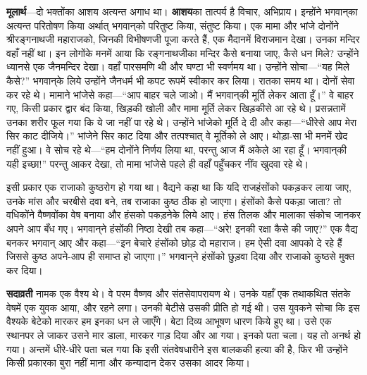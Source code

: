 \begin{sloppypar}\justifying{}
\textbf{मूलार्थ}—दो भक्तोंका आशय अत्यन्त अगाध था। \textbf{आशय}का तात्पर्य है विचार, अभिप्राय। इन्होंने भगवान्‌का अत्यन्त परितोषण किया अर्थात् भगवान्‌को परितुष्ट किया, संतुष्ट किया। एक मामा और भांजे दोनोंने श्रीरङ्गनाथजी महाराजको, जिनकी विभीषणजी पूजा करते हैं, एक मैदानमें विराजमान देखा। उनका मन्दिर वहाँ नहीं था। इन लोगोंके मनमें आया कि रङ्गनाथजीका मन्दिर कैसे बनाया जाए, कैसे धन मिले? उन्होंने ध्यानसे एक जैन\-मन्दिर देखा। वहाँ पारसमणि थी और घण्टा भी स्वर्णमय था। उन्होंने सोचा—“यह मिले कैसे?” भगवान्‌के लिये उन्होंने जैनधर्म भी कपट रूपमें स्वीकार कर लिया। रातका समय था। दोनों सेवा कर रहे थे। मामाने भांजेसे कहा—“आप बाहर चले जाओ। मैं भगवान्‌की मूर्ति लेकर आता हूँ।” वे बाहर गए, किसी प्रकार द्वार बंद किया, खिड़की खोली और मामा मूर्ति लेकर खिड़कीसे आ रहे थे। प्रसन्नतामें उनका शरीर फूल गया कि ये जा नहीं पा रहे थे। उन्होंने भांजेको मूर्ति दे दी और कहा—“धीरेसे आप मेरा सिर काट दीजिये।” भांजेने सिर काट दिया और तत्पश्चात् वे मूर्तिको ले आए। थोड़ा-सा भी मनमें खेद नहीं हुआ। वे सोच रहे थे—“हम दोनोंने निर्णय लिया था, परन्तु आज मैं अकेले आ रहा हूँ। भगवान्‌की यही इच्छा!” परन्तु आकर देखा, तो मामा भांजेसे पहले ही वहाँ पहुँचकर नींव खुदवा रहे थे।
\end{sloppypar}
\begin{sloppypar}\justifying{}
इसी प्रकार एक राजाको कुष्ठरोग हो गया था। वैद्यने कहा था कि यदि राजहंसोंको पकड़कर लाया जाए, उनके मांस और चरबीसे दवा बने, तब राजाका कुष्ठ ठीक हो जाएगा। हंसोंको कैसे पकड़ा जाता? तो वधिकोंने वैष्णवोंका वेष बनाया और हंसको पकड़नेके लिये आए। हंस तिलक और मालाका संकोच जानकर अपने आप बँध गए। भगवान्‌ने हंसोंकी निष्ठा देखी तब कहा—“अरे! इनकी रक्षा कैसे की जाए?” एक वैद्य बनकर भगवान् आए और कहा—“इन बेचारे हंसोंको छोड़ दो महाराज। हम ऐसी दवा आपको दे रहे हैं जिससे कुष्ठ अपने-आप ही समाप्त हो जाएगा।” भगवान्‌ने हंसोंको छुड़वा दिया और राजाको कुष्ठसे मुक्त कर दिया।
\end{sloppypar}
\begin{sloppypar}\justifying{}
\textbf{सदाव्रती} नामक एक वैश्य थे। वे परम वैष्णव और संत\-सेवा\-परायण थे। उनके यहाँ एक तथाकथित संतके वेषमें एक युवक आया, और रहने लगा। उनकी बेटीसे उसकी प्रीति हो गई थी। उस युवकने सोचा कि इस वैश्यके बेटेको मारकर हम इनका धन ले जाएँगे। बेटा दिव्य आभूषण धारण किये हुए था। उसे एक स्थानपर ले जाकर उसने मार डाला, मारकर गाड़ दिया और आ गया। इनको पता चला। यह तो अनर्थ हो गया। अन्तमें धीरे-धीरे पता चल गया कि इसी संतवेष\-धारीने इस बालककी हत्या की है, फिर भी उन्होंने किसी प्रकारका बुरा नहीं माना और कन्यादान देकर उसका आदर किया।
\end{sloppypar}
